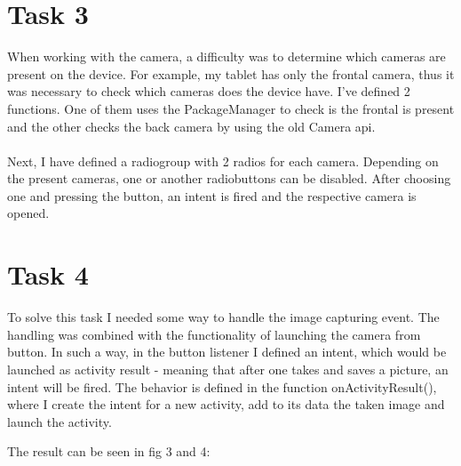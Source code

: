 \documentclass[12pt]{article}
\begin{document}
    \section*{Task 3}
        When working with the camera, a difficulty was to determine which cameras are present on the device. For example, my tablet has only the frontal camera, thus it was necessary to check which cameras does the device have. I've defined 2 functions. One of them uses the PackageManager to check is the frontal is present and the other checks the back camera by using the old Camera api.
        \\\\
        Next, I have defined a radiogroup with 2 radios for each camera. Depending on the present cameras, one or another radiobuttons can be disabled. After choosing one and pressing the button, an intent is fired and the respective camera is opened.

    \section*{Task 4}
        To solve this task I needed some way to handle the image capturing event. The handling was combined with the functionality of launching the camera from button. In such a way, in the button listener I defined an intent, which would be launched as activity result - meaning that after one takes and saves a picture, an intent will be fired. The behavior is defined in the function onActivityResult(), where I create the intent for a new activity, add to its data the taken image and launch the activity.

        The result can be seen in fig 3 and 4:
\end{document}
